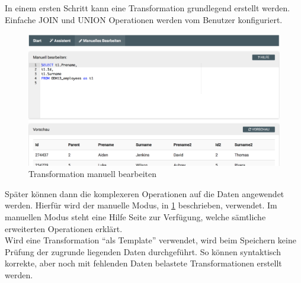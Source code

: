 In einem ersten Schritt kann eine Transformation grundlegend erstellt werden. Einfache JOIN und UNION Operationen werden vom Benutzer konfiguriert.
\begin{figure}[H]
\centering
\includegraphics[width=\linewidth]{fig/wizard-manual.png}
\caption{Transformation manuell bearbeiten}
\label{fig:pd:wizard-manual}
\end{figure}

Später können dann die komplexeren Operationen auf die Daten angewendet werden. Hierfür wird der manuelle Modus, in \cref{fig:pd:wizard-manual} beschrieben, verwendet. Im manuellen Modus steht eine Hilfe Seite zur Verfügung, welche sämtliche erweiterten Operationen erklärt.\\
Wird eine Transformation ``als Template'' verwendet, wird beim Speichern keine Prüfung der zugrunde liegenden Daten durchgeführt. So können syntaktisch korrekte, aber noch mit fehlenden Daten belastete Transformationen erstellt werden.

